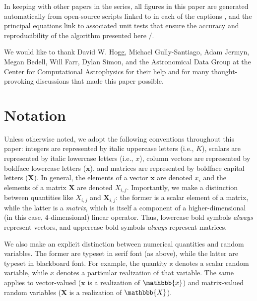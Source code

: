 \documentclass[modern,linenumbers]{aastex62}
\begin{document}
In keeping with other papers in the \starry series, all figures in this
paper are generated automatically from open-source scripts linked to in
each of the captions \codeicon, and the principal equations link to associated
unit tests that ensure the accuracy and reproducibility of the algorithm
presented here \testpassicon/\testfailicon.

%
%
%
%

\vspace{2em}

We would like to thank David W. Hogg, Michael Gully-Santiago, Adam Jermyn,
Megan Bedell, Will Farr, Dylan Simon, and the
Astronomical Data Group at the Center for Computational Astrophysics for
their help and for
many thought-provoking discussions that made this paper possible.

\vfill
\pagebreak


%
%
%
%

\pagebreak


\vfill
\clearpage

\pagebreak

%
%
%
%

\appendix


%
%
%
%

\section{Notation}
\label{sec:notation}
%
Unless otherwise noted, we adopt
the following conventions throughout this paper:
integers are represented by italic uppercase letters (i.e., $K$),
scalars are represented by italic lowercase
letters (i.e., $x$), column vectors are
represented by boldface lowercase letters
($\mathbf{x}$), and matrices are represented
by boldface capital letters ($\mathbf{X}$). In general, the elements of a vector
$\mathbf{x}$ are denoted $x_i$ and the elements of a matrix $\mathbf{X}$
are denoted $X_{i,j}$. Importantly, we make a distinction between
quantities like $X_{i,j}$ and $\mathbf{X}_{i,j}$: the former is a scalar
element of a matrix, while the latter is a \emph{matrix}, which is itself
a component of a higher-dimensional (in this case, 4-dimensional) linear
operator. Thus, lowercase bold symbols \emph{always} represent vectors, and
uppercase bold symbols \emph{always} represent matrices.

We also make an explicit distinction
between numerical quantities and random variables. The former are typeset
in serif font (as above), while the latter are typeset in blackboard font.
For example, the quantity $\mathbb{x}$ denotes a scalar random variable,
while $x$ denotes a particular realization of that variable. The same
applies to vector-valued ($\mathbf{x}$ is a realization of $\mathbbb{x}$)
and matrix-valued random variables
($\mathbf{X}$ is a realization of $\mathbbb{X}$).
\end{document}
